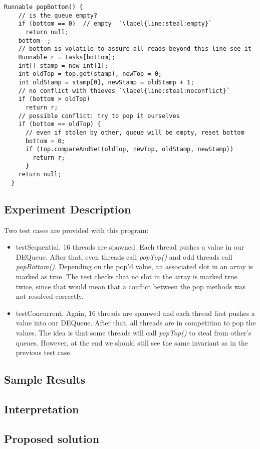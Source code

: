 \par
\hfill
\begin{lstlisting}[style=numbers]
  Runnable popBottom() {
    // is the queue empty?
    if (bottom == 0)  // empty  `\label{line:steal:empty}`
      return null;
    bottom--;
    // bottom is volatile to assure all reads beyond this line see it
    Runnable r = tasks[bottom];
    int[] stamp = new int[1];
    int oldTop = top.get(stamp), newTop = 0;
    int oldStamp = stamp[0], newStamp = oldStamp + 1;
    // no conflict with thieves `\label{line:steal:noconflict}`
    if (bottom > oldTop)
      return r;
    // possible conflict: try to pop it ourselves
    if (bottom == oldTop) {
      // even if stolen by other, queue will be empty, reset bottom
      bottom = 0;
      if (top.compareAndSet(oldTop, newTop, oldStamp, newStamp))
        return r;
      } 
    return null;
  }
\end{lstlisting}
\hfill
\par
\subsection{Experiment Description}
\par
Two test cases are provided with this program:
\begin{itemize}
\item testSequential. 16 threads are spawned. Each thread pushes a value in our
DEQueue. After that, even threads call \textit{popTop()} and odd threads call
\textit{popBottom()}. Depending on the pop'd value, an associated slot in an
array is marked as true. The test checks that no slot in the array is marked
true twice, since that would mean that a conflict between the pop methods was
not resolved correctly.
\item testConcurrent. Again, 16 threads are spanwed and each thread first pushes
a value into our DEQueue. After that, all threads are in competition to pop the
values. The idea is that some threads will call \textit{popTop()} to steal from
other's queues. However, at the end we should still see the same invariant as in
the previous test case.
\end{itemize}
\par
\subsection{Sample Results}
\par
\par
\subsection{Interpretation}
\par
\par
\subsection{Proposed solution}
\par
\par
